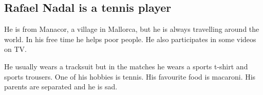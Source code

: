 \subsection*{Rafael Nadal is a tennis player}

He is from Manacor, a village in Mallorca, but he is always travelling around the world. In his free time he helps poor people. He also participates in some videos on TV.

He usually wears a tracksuit but in the matches he wears a sports t-shirt and sports trousers. One of his hobbies is tennis. His favourite food is macaroni. His parents are separated and he is sad.           



